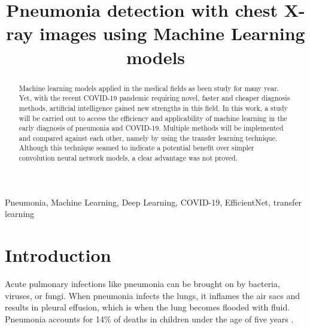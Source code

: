 \documentclass[conference]{IEEEtran}
\begin{document}
\title{Pneumonia detection with chest X-ray images using Machine Learning models}

\author{
\and
{}
}

\maketitle

\begin{abstract}
Machine learning models applied in the medical fields as been study for many year. Yet, with the recent COVID-19 pandemic requiring novel, faster and cheaper diagnosis methods, artificial intelligence gained new strengths in this field. In this work, a study will be carried out to access the efficiency and applicability of machine learning in the early diagnosis of pneumonia and COVID-19. Multiple methods will be implemented and compared against each other, namely by using the transfer learning technique. Although this technique seamed to indicate a potential benefit over simpler convolution neural network models, a clear advantage was not proved.
\end{abstract}

\begin{IEEEkeywords}
Pneumonia, Machine Learning, Deep Learning, COVID-19, EfficientNet, transfer learning
\end{IEEEkeywords}

\section{Introduction}

Acute pulmonary infections like pneumonia can be brought on by bacteria, viruses, or fungi. When pneumonia infects the lungs, it inflames the air sacs and results in pleural effusion, which is when the lung becomes flooded with fluid.
%
Pneumonia accounts for 14\% of deaths in children under the age of five years \cite{who_pneumonia}. 
\end{document}
